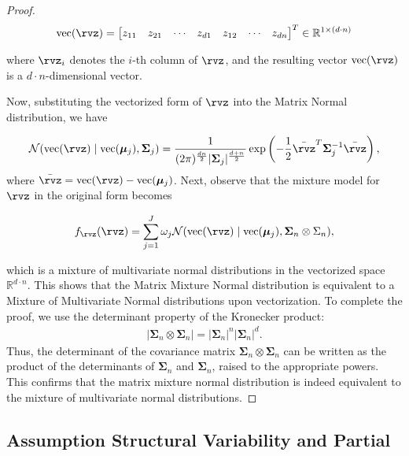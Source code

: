 \documentclass{article} %
\theoremstyle{plain}
\theoremstyle{definition}
\theoremstyle{remark}
\numberwithin{equation}{section}
\begin{document}
\begin{proof}
\[
\text{vec}(\rvz) = \begin{bmatrix}
z_{11} & z_{21} & \cdots & z_{d1} & z_{12} & \cdots & z_{dn}
\end{bmatrix}^T \in \mathbb{R}^{1 \times (d \cdot n)}
\]



where \(\rvz_i\) denotes the \(i\)-th column of \(\rvz\), and the resulting vector \(\text{vec}(\rvz)\) is a \(d \cdot n\)-dimensional vector.

Now, substituting the vectorized form of \(\rvz\) into the Matrix Normal distribution, we have

\begin{align}
\mathcal{N}(\text{vec}(\rvz) \mid \text{vec}(\boldsymbol{\mu}_j), \boldsymbol{\Sigma}_j) = \frac{1}{(2\pi)^{\frac{dn}{2}} |\boldsymbol{\Sigma}_j|^{\frac{d+n}{2}}} \exp\left( -\frac{1}{2} \Bar{\rvz}^T \boldsymbol{\Sigma}_{j}^{-1}\Bar{\rvz} \right),
\end{align}
where $\Bar{\rvz}=\text{vec}(\rvz) - \text{vec}(\boldsymbol{\mu}_j)$. Next, observe that the mixture model for \(\rvz\) in the original form becomes

\begin{align}
f_{\rvz}(\rvz) = \sum_{j=1}^{J} \omega_j \mathcal{N}(\text{vec}(\rvz) \mid \text{vec}(\boldsymbol{\mu}_j), \boldsymbol\Sigma_n \otimes \Sigma_n),
\end{align}

which is a mixture of multivariate normal distributions in the vectorized space \(\mathbb{R}^{d \cdot n}\). This shows that the Matrix Mixture Normal distribution is equivalent to a Mixture of Multivariate Normal distributions upon vectorization. To complete the proof, we use the determinant property of the Kronecker product:
\begin{align}
|\boldsymbol\Sigma_n \otimes \boldsymbol\Sigma_n| = |\boldsymbol\Sigma_n|^n |\boldsymbol\Sigma_n|^d.
\end{align}
Thus, the determinant of the covariance matrix \(\boldsymbol\Sigma_n \otimes \boldsymbol\Sigma_n\) can be written as the product of the determinants of \(\boldsymbol\Sigma_n\) and \(\boldsymbol\Sigma_n\), raised to the appropriate powers. This confirms that the matrix mixture normal distribution is indeed equivalent to the mixture of multivariate normal distributions.
\end{proof}


\subsection{Assumption Structural Variability and Partial}\label{app:assumption_validation}
\end{document}
